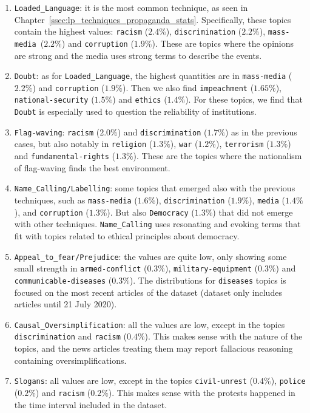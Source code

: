 \begin{enumerate}
    \item \texttt{Loaded\_Language}: it is the most common technique, as seen in Chapter~\ref{ssec:lp_techniques_propaganda_stats}. Specifically, these topics contain the highest values: \texttt{racism} ($2.4\%$), \texttt{discrimination} ($2.2\%$), \texttt{mass-media }($2.2\%$) and \texttt{corruption} ($1.9\%$). These are topics where the opinions are strong and the media uses strong terms to describe the events.
    \item \texttt{Doubt}: as for \texttt{Loaded\_Language}, the highest quantities are in \texttt{mass-media} ($2.2\%$) and \texttt{corruption} ($1.9\%$). Then we also find \texttt{impeachment} ($1.65\%$), \texttt{national-security} ($1.5\%$) and \texttt{ethics} ($1.4\%$). For these topics, we find that \texttt{Doubt} is especially used to question the reliability of institutions.
    \item \texttt{Flag-waving}: \texttt{racism} ($2.0\%$) and \texttt{discrimination} ($1.7\%$) as in the previous cases, but also notably in \texttt{religion} ($1.3\%$), \texttt{war} ($1.2\%$), \texttt{terrorism} ($1.3\%$) and \texttt{fundamental-rights} ($1.3\%$). These are the topics where the nationalism of flag-waving finds the best environment.
    \item \texttt{Name\_Calling/Labelling}: some topics that emerged also with the previous techniques, such as \texttt{mass-media} ($1.6\%$), \texttt{discrimination} ($1.9\%$), \texttt{media} ($1.4\%$), and \texttt{corruption} ($1.3\%$). But also \texttt{Democracy} ($1.3\%$) that did not emerge with other techniques. \texttt{Name\_Calling} uses resonating and evoking terms that fit with topics related to ethical principles about democracy.
    \item \texttt{Appeal\_to\_fear/Prejudice}: the values are quite low, only showing some small strength in \texttt{armed-conflict} ($0.3\%$), \texttt{military-equipment} ($0.3\%$) and \texttt{communicable-diseases} ($0.3\%$). The distributions for \texttt{diseases} topics is focused on the most recent articles of the dataset (dataset only includes articles until 21 July 2020).
    \item \texttt{Causal\_Oversimplification}: all the values are low, except in the topics \texttt{discrimination} and \texttt{racism} ($0.4\%$). This makes sense with the nature of the topics, and the news articles treating them may report fallacious reasoning containing oversimplifications.
    \item \texttt{Slogans}: all values are low, except in the topics \texttt{civil-unrest} ($0.4\%$), \texttt{police} ($0.2\%$) and \texttt{racism} ($0.2\%$). This makes sense with the protests happened in the time interval included in the dataset. 
\end{enumerate}

